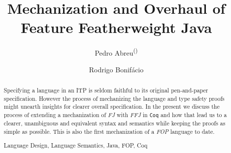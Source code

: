 \documentclass[runningheads,a4paper]{doc/llncs}
\newcommand{\keywords}[1]{\par\addvspace\baselineskip
\noindent\keywordname\enspace\ignorespaces#1}
\begin{document}
\mainmatter  %

\title{Mechanization and Overhaul of Feature Featherweight Java}


%
%
\author{Pedro Abreu\textsuperscript{(\Letter)}%
\and Rodrigo Bonif\'acio}
%

%
%

\maketitle


\begin{abstract}
Specifying a language in an \ac{ITP} is seldom faithful
to its original pen-and-paper specification. However the process of mechanizing the
language and type safety proofs might unearth insights for clearer overall specification.
In the present we discuss the process of extending a mechanization of \textit{\ac{FJ}}
with \textit{\ac{FFJ}} in \texttt{Coq} and how that lead us to a
clearer, unambiguous and equivalent syntax and semantics while keeping the proofs as simple as possible.
This is also the first mechanization of a \textit{\ac{FOP}} language to date.


\keywords{Language Design, Language Semantics, Java, FOP, Coq}
\end{abstract}
\end{document}

